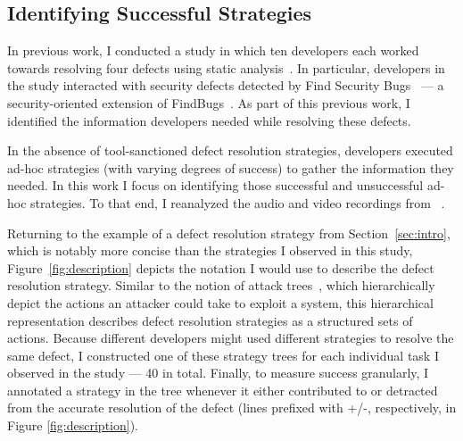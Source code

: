 \documentclass{sig-alternate}
\begin{document}

%

\subsection{Identifying Successful Strategies}
In previous work, I conducted a study in which ten developers each worked towards resolving four defects using static analysis~\cite{Smith2015}.
In particular, developers in the study interacted with security defects detected by Find Security Bugs~\cite{FindSecurityBugs} --- a security-oriented extension of FindBugs~\cite{FindBugs}.
As part of this previous work, I identified the information developers needed while resolving these defects.

In the absence of tool-sanctioned defect resolution strategies, developers executed ad-hoc strategies (with varying degrees of success) to gather the information they needed.
In this work I focus on identifying those successful and unsuccessful ad-hoc strategies.
To that end, I reanalyzed the audio and video recordings from ~\cite{Smith2015}. 

Returning to the example of a defect resolution strategy from Section~\ref{sec:intro}, which is notably more concise than the strategies I observed in this study, Figure~\ref{fig:description} depicts the notation I would use to describe the defect resolution strategy. 
Similar to the notion of attack trees~\cite{attackTrees}, which hierarchically depict the actions an attacker could take to exploit a system, this hierarchical representation describes defect resolution strategies as a structured sets of actions.
Because different developers might used different strategies to resolve the same defect, I constructed one of these strategy trees for each individual task I observed in the study --- 40 in total.
Finally, to measure success granularly, I annotated a strategy in the tree whenever it either contributed to or detracted from the accurate resolution of the defect (lines prefixed with +/-, respectively, in Figure \ref{fig:description}).
\end{document}
